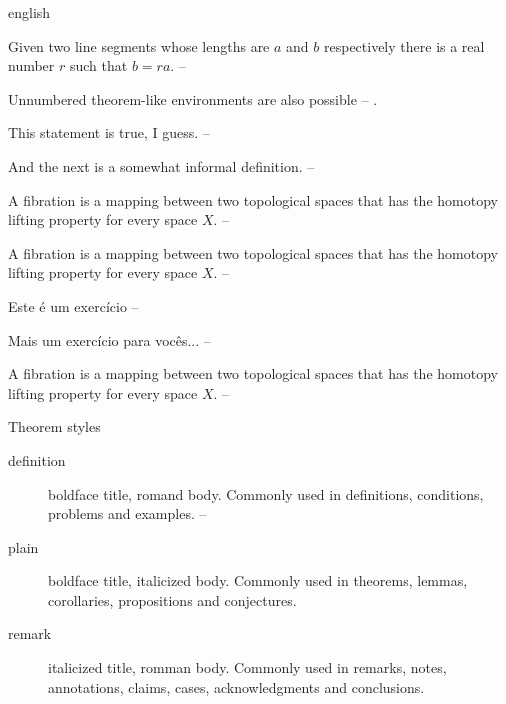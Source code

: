 \begin{otherlanguage*}{english}

\begin{lema}
    Given two line segments whose lengths are $a$ and $b$ respectively there is
    a real number $r$ such that $b=ra$. -- \showfont
\end{lema}

Unnumbered theorem-like environments are also possible -- \showfont.

\begin{observacao}
    This statement is true, I guess. -- \showfont
\end{observacao}

And the next is a somewhat informal definition. -- \showfont

\begin{definicao}
    A fibration is a mapping between two topological spaces that has the
    homotopy lifting property for every space $X$. -- \showfont
\end{definicao}

\begin{exemplo}
    A fibration is a mapping between two topological spaces that has the
    homotopy lifting property for every space $X$. -- \showfont
\end{exemplo}

\begin{exercicio}
    Este é um exercício -- \showfont

\end{exercicio}

\begin{exercicio}
    Mais um exercício para vocês... -- \showfont

\end{exercicio}

\begin{condicao}
    A fibration is a mapping between two topological spaces that has the
    homotopy lifting property for every space $X$. -- \showfont
\end{condicao}
Theorem styles

\begin{description}
    \item[definition] boldface title, romand body. Commonly used in definitions,
        conditions, problems and examples. -- \showfont
\item[plain] boldface title, italicized body. Commonly used in theorems, lemmas,
    corollaries, propositions and conjectures.
\item[remark] italicized title, romman body. Commonly used in remarks, notes,
    annotations, claims, cases, acknowledgments and conclusions.
\end{description}

\end{otherlanguage*}

